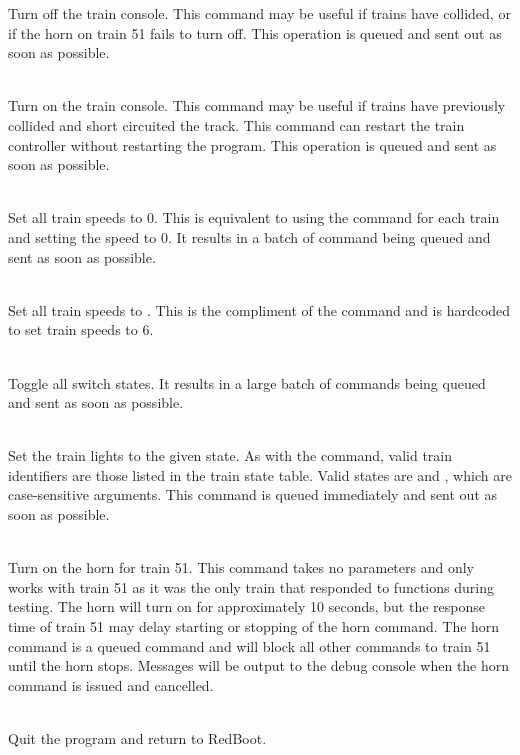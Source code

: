 \documentclass[pdftex,10pt,a4paper]{article}
\begin{document}
\begin{description}
Turn off the train console. This command may be useful if trains have
collided, or if the horn on train 51 fails to turn off. This operation
is queued and sent out as soon as possible.

\item[\ttt{all start}] \hfill \\

Turn on the train console. This command may be useful if trains have
previously collided and short circuited the track. This command can
restart the train controller without restarting the program. This
operation is queued and sent as soon as possible.

\item[\ttt{halt}] \hfill \\

Set all train speeds to 0. This is equivalent to using the 
command for each train and setting the speed to 0. It results in a
batch of command being queued and sent as soon as possible.

\item[\ttt{go}] \hfill \\

Set all train speeds to . This is the compliment of the
 command and is hardcoded to set train speeds to 6.

\item[\ttt{flip}] \hfill \\

Toggle all switch states. It results in a large batch of commands
being queued and sent as soon as possible.

\item[\ttt{lt <train> <state>}] \hfill \\

Set the train lights to the given state. As with the  command,
valid train identifiers are those listed in the train state
table. Valid states are  and , which are
case-sensitive arguments. This command is queued immediately and sent
out as soon as possible.

\item[\ttt{horn}] \hfill \\

Turn on the horn for train 51. This command takes no parameters and
only works with train 51 as it was the only train that responded to
functions during testing. The horn will turn on for approximately 10
seconds, but the response time of train 51 may delay starting or
stopping of the horn command. The horn command is a queued command and
will block all other commands to train 51 until the horn
stops. Messages will be output to the debug console when the horn
command is issued and cancelled.

\item[\ttt{q}] \hfill \\

Quit the program and return to RedBoot.

\end{description}
\end{document}
